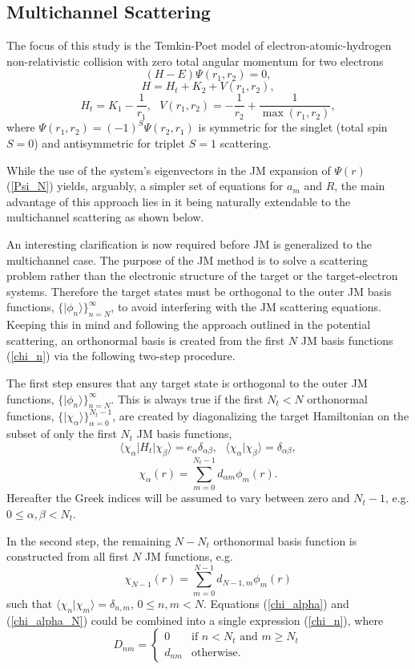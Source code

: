 \documentclass[aip,pra,showpacs,aps,twocolumn,groupedaddress,floatfix]{revtex4}
\newcommand{\beq}{\begin{equation}}
\newcommand{\eeq}{\end{equation}}
\begin{document}
\subsection{Multichannel Scattering}
The focus of this study is the Temkin-Poet model \cite{P78, T62} of electron-atomic-hydrogen non-relativistic collision with zero total angular momentum for two electrons
\beq
(H-E)\Psi(r_1,r_2)=0, \label{H_E_Psi}
\eeq
\beq
H=H_t+K_2+V(r_1,r_2),
\label{H_HyMinus}
\eeq
\beq
H_t=K_1-\frac{1}{r_1}, \ \ \ V(r_1,r_2)= -\frac{1}{r_2} + \frac{1}{\max (r_1, r_2)},
\label{V_12}
\eeq
where $\Psi(r_1, r_2)=(-1)^S\Psi(r_2, r_1)$ is symmetric for the singlet (total spin $S=0$) and antisymmetric for triplet $S=1$ scattering.

While the use of the system's eigenvectors in the JM expansion of $\Psi(r)$ (\ref{Psi_N}) yields, arguably, a simpler set of equations for $a_m$ and $R$, the main advantage of this approach lies in it being naturally extendable to the multichannel scattering as shown below.

An interesting clarification is now required before JM is generalized to the multichannel case. The purpose of the JM method is to solve a scattering problem rather than the electronic structure of the target or the target-electron systems. Therefore the target states must be orthogonal to the outer JM basis functions, $\{|\phi_n\rangle\}_{n=N}^\infty$, to avoid interfering with the JM scattering equations. Keeping this in mind and following the approach outlined in the potential scattering, an orthonormal basis is created from the first $N$ JM basis functions (\ref{chi_n}) via the following two-step procedure.

The first step ensures that any target state is orthogonal to the outer JM functions, $\{|\phi_n\rangle\}_{n=N}^\infty$. This is always true if the first $N_t<N$ orthonormal functions, $\{|\chi_{\alpha}\rangle\}_{\alpha=0}^{N_t-1}$, are created by diagonalizing the target Hamiltonian on the subset of only the first $N_t$ JM basis functions,
\beq
\langle\chi_{\alpha}|H_t|\chi_{\beta}\rangle=e_{\alpha}\delta_{\alpha \beta}, \ \ \
\langle\chi_{\alpha}|\chi_{\beta}\rangle=\delta_{\alpha \beta}, \label{chi_Ht}
\eeq
\beq
\chi_{\alpha}(r)=\sum_{m=0}^{N_t-1} d_{\alpha m} \phi_m(r). \label{chi_alpha}
\eeq
Hereafter the Greek indices will be assumed to vary between zero and $N_t-1$, e.g. $0\leq \alpha, \beta < N_t$.

In the second step, the remaining $N-N_t$ orthonormal basis function is constructed from all first $N$ JM functions, e.g.
\beq
\chi_{N-1}(r)=\sum_{m=0}^{N-1} d_{N-1,m} \phi_m(r) \label{chi_alpha_N}
\eeq
such that $\langle\chi_{n}|\chi_{m}\rangle=\delta_{n, m}$, $0\leq n, m < N$. Equations (\ref{chi_alpha}) and (\ref{chi_alpha_N}) could be combined into a single expression (\ref{chi_n}), where
\beq
D_{nm} = \left\{
\begin{array}{ll}
0 & \mbox{if $n < N_t$ and $m \geq N_t$} \\
d_{nm} & \mbox{otherwise.}   \end{array}  \right.
\label{D_nm}
\eeq
\end{document}

